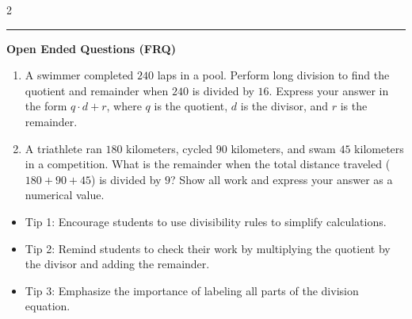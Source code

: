 \documentclass[10pt]{article}
\begin{document}
\begin{multicols}{2}
\begin{enumerate}[label=\textbf{Q\arabic*.}, leftmargin=*, itemsep=6pt, parsep=0pt]
\end{enumerate}
\end{multicols}

\vspace{-0.2cm}
\hrule
\vspace{0.2cm}
\textbf{\small Open Ended Questions (FRQ)}
\begin{enumerate}[label=\textbf{Q\arabic*.}, start=9, itemsep=5pt, topsep=0pt]

  \item \small A swimmer completed $240$ laps in a pool. Perform long division to find the quotient and remainder when $240$ is divided by $16$. Express your answer in the form $q \cdot d + r$, where $q$ is the quotient, $d$ is the divisor, and $r$ is the remainder. \vspace{2cm}

  \item \small A triathlete ran $180$ kilometers, cycled $90$ kilometers, and swam $45$ kilometers in a competition. What is the remainder when the total distance traveled ($180 + 90 + 45$) is divided by $9$? Show all work and express your answer as a numerical value. \vspace{2cm}

\end{enumerate}

\vfill

\begin{tcolorbox}[colback=blue!5, colframe=mainblue!50, title=\small \textbf{Chef's Tips}, fonttitle=\bfseries, bottom=1mm]
\begin{itemize}[noitemsep, topsep=2pt, leftmargin=0.5cm]
  \item \scriptsize Tip 1: Encourage students to use divisibility rules to simplify calculations.\item \scriptsize Tip 2: Remind students to check their work by multiplying the quotient by the divisor and adding the remainder.\item \scriptsize Tip 3: Emphasize the importance of labeling all parts of the division equation.
\end{itemize}
\end{tcolorbox}
\end{document}
